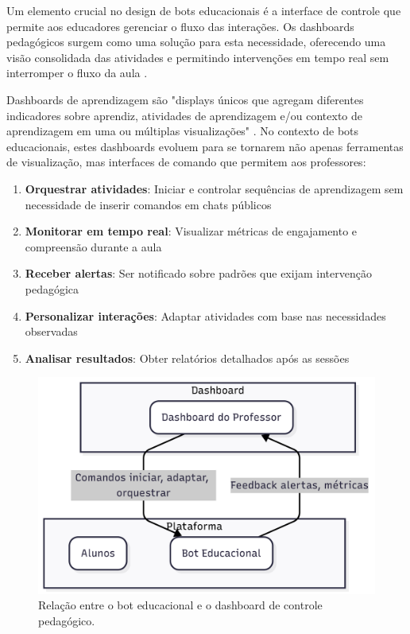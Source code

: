 Um elemento crucial no design de bots educacionais é a interface de controle que permite aos educadores gerenciar o fluxo das interações. Os dashboards pedagógicos surgem como uma solução para esta necessidade, oferecendo uma visão consolidada das atividades e permitindo intervenções em tempo real sem interromper o fluxo da aula \cite{verbert2013}.

Dashboards de aprendizagem são "displays únicos que agregam diferentes indicadores sobre aprendiz, atividades de aprendizagem e/ou contexto de aprendizagem em uma ou múltiplas visualizações" \cite{verbert2013}. No contexto de bots educacionais, estes dashboards evoluem para se tornarem não apenas ferramentas de visualização, mas interfaces de comando que permitem aos professores:

\begin{enumerate}
\item \textbf{Orquestrar atividades}: Iniciar e controlar sequências de aprendizagem sem necessidade de inserir comandos em chats públicos
\item \textbf{Monitorar em tempo real}: Visualizar métricas de engajamento e compreensão durante a aula
\item \textbf{Receber alertas}: Ser notificado sobre padrões que exijam intervenção pedagógica
\item \textbf{Personalizar interações}: Adaptar atividades com base nas necessidades observadas
\item \textbf{Analisar resultados}: Obter relatórios detalhados após as sessões
\end{enumerate}

\begin{figure}[H]
\centering
\includegraphics[width=12cm]{relacao-dashboard-bot.png}
\caption{Relação entre o bot educacional e o dashboard de controle pedagógico.}
\label{fig:dashboard-bot}
\end{figure}


